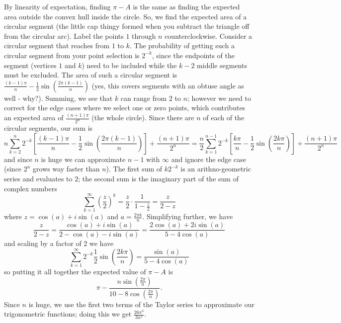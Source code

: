 \begin{solution}
    By linearity of expectation, finding $\pi - A$ is the same as finding the expected area outside the convex hull inside the circle. So, we find the expected 
    area of a circular segment (the little cap thingy formed when you subtract the triangle off from the circular arc). Label the points $1$ through $n$ counterclockwise.
    Consider a circular segment that reaches from $1$ to $k$. The probability of getting such a circular segment from your point selection is $2^{-k}$, since
    the endpoints of the segment (vertices $1$ and $k$) need to be included while the $k - 2$ middle segments must be excluded. The area of such a circular segment
    is $\frac{(k - 1) \pi}{n} - \frac{1}{2}\sin\left(\frac{2 \pi (k - 1)}{n}\right)$ (yes, this covers segments with an obtuse angle as well - why?). Summing, we see that $k$ can range from 
    $2$ to $n$; however we need to correct for the edge cases where we select one or zero points, which contributes an expected area of $\frac{(n + 1)\pi}{2^n}$ (the whole circle).
    Since there are $n$ of each of the circular segments, our sum is $$n \sum_{k = 2}^{n} 2^{-k} \left[\dfrac{(k - 1)\pi}{n} - \dfrac{1}{2}\sin\left(\dfrac{2\pi(k - 1)}{n}\right)\right] + \dfrac{(n + 1)\pi}{2^n} = \dfrac{n}{2} \sum_{k = 1}^{n - 1} 2^{-k} \left[\dfrac{k\pi}{n} - \dfrac{1}{2}\sin\left(\dfrac{2k\pi}{n}\right)\right] + \dfrac{(n + 1)\pi}{2^n}$$
    and since $n$ is huge we can approximate $n - 1$ with $\infty$ and ignore the edge case (since $2^n$ grows way faster than $n$). The first sum of $k2^{-k}$ is an arithno-geometric
    series and evaluates to $2$; the second sum is the imaginary part of the sum of complex numbers $$\sum_{k = 1}^\infty \left(\dfrac{z}{2}\right)^k = \dfrac{z}{2} \cdot \dfrac{1}{1 - \frac{z}{2}} = \dfrac{z}{2 - z}$$
    where $z = \cos(a) + i \sin(a)$ and $a = \frac{2 \pi k}{n}$. Simplifying further, we have $$\dfrac{z}{2 - z} = \dfrac{\cos(a) + i\sin(a)}{2 - \cos(a) - i\sin(a)} = \dfrac{2 \cos(a) + 2i \sin(a)}{5 - 4\cos(a)}$$
    and scaling by a factor of 2 we have $$\sum_{k = 1}^\infty 2^{-k} \dfrac{1}{2}\sin\left(\dfrac{2k\pi}{n}\right) = \dfrac{\sin(a)}{5 - 4 \cos(a)}$$
    so putting it all together the expected value of $\pi - A$ is $$\pi - \dfrac{n \sin\left(\frac{2\pi}{n}\right)}{10 - 8 \cos\left(\frac{2\pi}{n}\right)}.$$
    Since $n$ is huge, we use the first two terms of the Taylor series to approximate our trigonometric functions; doing this we get $\boxed{\frac{26 \pi^3}{3n^2}}.$
\end{solution}\newpage


